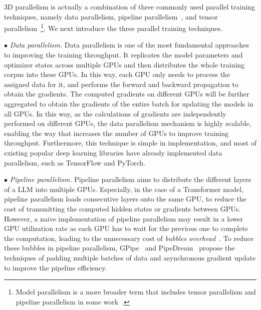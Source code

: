 { %
{3D parallelism is actually a combination of three commonly used parallel training techniques, namely data parallelism, pipeline parallelism~\cite{Huang-NeurIPS-2019-GPipe,Harlap-arXiv-2018-PipeDream}, and tensor parallelism~\cite{Shoeybi-arXiv-2019-Megatron}\footnote{Model parallelism is a more broader term that includes tensor parallelism and pipeline parallelism in some work~\cite{Shoeybi-arXiv-2019-Megatron}.}.} We next introduce the three parallel training techniques. 


$\bullet$ \emph{Data parallelism.}
Data parallelism is one of the most fundamental approaches to improving the training throughput. 
It  replicates the model parameters and optimizer states across multiple GPUs and then distributes the whole training corpus into these GPUs.
In this way, each GPU only needs to process the assigned data for it, and performs the forward and backward propagation to obtain the gradients.
The computed gradients on different GPUs will be further aggregated to obtain the gradients of the entire batch for updating the models in all GPUs.
In this way, as the calculations of gradients are independently performed on different GPUs, the data parallelism mechanism is highly scalable,  %
{enabling the way that increases the number of GPUs to improve training throughput.} 
Furthermore,  this technique is simple in implementation, and most of existing popular deep learning libraries have already implemented data parallelism, such as TensorFlow and PyTorch.


$\bullet$ \emph{Pipeline parallelism.}
Pipeline parallelism aims to distribute the different layers of a LLM into multiple GPUs.
Especially, in the case of a Transformer model, pipeline parallelism loads consecutive layers onto the same GPU, to reduce the cost of transmitting the computed hidden states or gradients between GPUs.
However, a naive implementation of pipeline parallelism may result in a lower GPU utilization rate as each GPU has to wait for the previous one to complete the computation, leading to the unnecessary cost of \emph{bubbles overhead}{~\cite{Huang-NeurIPS-2019-GPipe}}.
To reduce these bubbles in pipeline parallelism, GPipe~\cite{Huang-NeurIPS-2019-GPipe} and PipeDream~\cite{Harlap-arXiv-2018-PipeDream} propose the techniques of padding multiple batches of data and asynchronous gradient update to improve the pipeline efficiency.

}
